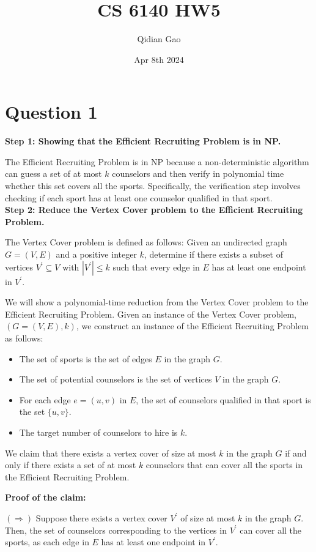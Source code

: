 \documentclass{article}
\title{CS 6140 HW5}
\author{Qidian Gao}
\date{Apr 8th 2024}
\begin{document}
\maketitle
\section{Question 1}

\textbf{Step 1: Showing that the Efficient Recruiting Problem is in NP.}

The Efficient Recruiting Problem is in NP because a non-deterministic algorithm can guess a set of at most $k$ counselors and then verify in polynomial time whether this set covers all the sports. Specifically, the verification step involves checking if each sport has at least one counselor qualified in that sport.\\
\textbf{Step 2: Reduce the Vertex Cover problem to the Efficient Recruiting Problem.}

The Vertex Cover problem is defined as follows: Given an undirected graph $G=(V, E)$ and a positive integer $k$, determine if there exists a subset of vertices $V^{\prime} \subseteq V$ with $\left|V^{\prime}\right| \leq k$ such that every edge in $E$ has at least one endpoint in $V^{\prime}$.

We will show a polynomial-time reduction from the Vertex Cover problem to the Efficient Recruiting Problem.
Given an instance of the Vertex Cover problem, $(G=(V, E), k)$, we construct an instance of the Efficient Recruiting Problem as follows:
\begin{itemize}
    \item The set of sports is the set of edges $E$ in the graph $G$.
    \item The set of potential counselors is the set of vertices $V$ in the graph $G$.
    \item For each edge $e=(u, v)$ in $E$, the set of counselors qualified in that sport is the set $\{u, v\}$.
    \item The target number of counselors to hire is $k$.
\end{itemize}

We claim that there exists a vertex cover of size at most $k$ in the graph $G$ if and only if there exists a set of at most $k$ counselors that can cover all the sports in the Efficient Recruiting Problem.

\textbf{Proof of the claim:}

$(\Rightarrow)$ Suppose there exists a vertex cover $V^{\prime}$ of size at most $k$ in the graph $G$. Then, the set of counselors corresponding to the vertices in $V^{\prime}$ can cover all the sports, as each edge in $E$ has at least one endpoint in $V^{\prime}$.
\end{document}
